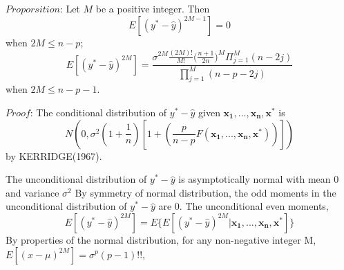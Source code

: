 \documentclass[11pt]{article}
\begin{document}
$Proporsition$: Let $M$ be a positive integer. Then 
$$E[(y^{*}-\hat{y})^{2M-1}]=0$$
when $2M\le n-p$;
$$E[(y^{*}-\hat{y})^{2M}]=\frac{\sigma^{2M}\frac{(2M)!}{M!}{(\frac{n+1}{2n}})^{M}\Pi^{M}_{j=1}(n-2j)}{\prod^{M}_{j=1}(n-p-2j)}$$
when $2M\le n-p-1$.

$Proof$: The conditional distribution of $y^{*}-\hat{y}$ given $\boldsymbol{x_1,...,x_n,x^{*}}$ is $$N(0,\sigma^{2}(1+\frac{1}{n})[1+(\frac{p}{n-p}F(\boldsymbol{x_1,...,x_n,x^{*}}))])$$ by  KERRIDGE(1967). 

The unconditional distribution of  $y^{*}-\hat{y}$ is asymptotically normal with mean 0 and variance $\sigma^{2}$
By symmetry of normal distribution, the odd moments in the unconditional distribution of $y^{*}-\hat{y}$ are 0. The unconditional even moments, 
$$E[(y^{*}-\hat{y})^{2M}]= E\{E[(y^{*}-\hat{y})^{2M}|\boldsymbol{x_1,...,x_n,x^{*}}]\}$$
By properties of the normal distribution, for any non-negative integer M, $E[(x-\mu)^{2M}]=\sigma^{p}(p-1)!!$,
\end{document}
